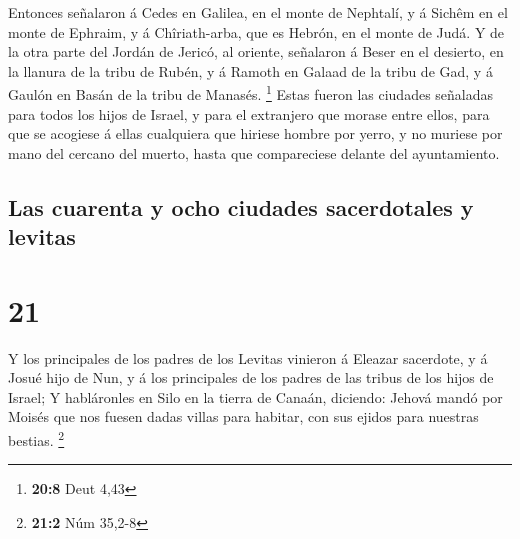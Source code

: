  Entonces señalaron á Cedes en Galilea, en el monte de
Nephtalí, y á Sichêm en el monte de Ephraim, y á Chîriath-arba, que es
Hebrón, en el monte de Judá.  Y de la otra parte del
Jordán de Jericó, al oriente, señalaron á Beser en el desierto, en la
llanura de la tribu de Rubén, y á Ramoth en Galaad de la tribu de Gad, y
á Gaulón en Basán de la tribu de Manasés. \footnote{\textbf{20:8} Deut
  4,43}  Estas fueron las ciudades señaladas para todos
los hijos de Israel, y para el extranjero que morase entre ellos, para
que se acogiese á ellas cualquiera que hiriese hombre por yerro, y no
muriese por mano del cercano del muerto, hasta que compareciese delante
del ayuntamiento.

\hypertarget{las-cuarenta-y-ocho-ciudades-sacerdotales-y-levitas}{%
\subsection{Las cuarenta y ocho ciudades sacerdotales y
levitas}\label{las-cuarenta-y-ocho-ciudades-sacerdotales-y-levitas}}

\hypertarget{section-20}{%
\section{21}\label{section-20}}

 Y los principales de los padres de los Levitas vinieron á
Eleazar sacerdote, y á Josué hijo de Nun, y á los principales de los
padres de las tribus de los hijos de Israel;  Y
habláronles en Silo en la tierra de Canaán, diciendo: Jehová mandó por
Moisés que nos fuesen dadas villas para habitar, con sus ejidos para
nuestras bestias. \footnote{\textbf{21:2} Núm 35,2-8}

